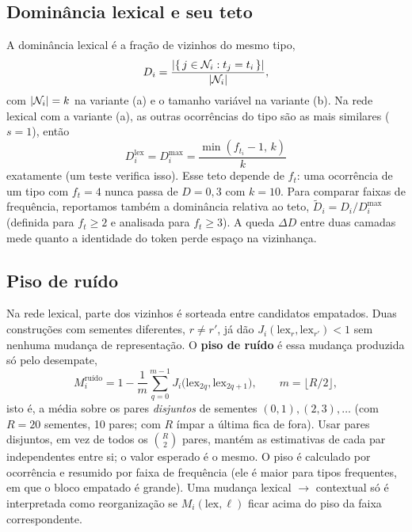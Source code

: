 \subsection{Dominância lexical e seu teto}\label{sec:met-dominancia}

A dominância lexical é a fração de vizinhos do mesmo tipo,
\begin{equation}
    D_i=\frac{|\{\,j\in\mathcal{N}_i : t_j=t_i\,\}|}{|\mathcal{N}_i|},
\end{equation}
com $|\mathcal{N}_i|=k$ na variante (a) e o tamanho variável na variante (b). Na rede lexical com a
variante (a), as outras ocorrências do tipo são as mais similares ($s=1$), então
\begin{equation}
    D_i^{\mathrm{lex}}=D^{\max}_i=\frac{\min(f_{t_i}-1,\,k)}{k}
\end{equation}
exatamente (um teste verifica isso). Esse teto depende de $f_t$: uma ocorrência de um tipo com
$f_t=4$ nunca passa de $D=0{,}3$ com $k=10$. Para comparar faixas de frequência, reportamos
também a dominância relativa ao teto, $\tilde D_i=D_i/D^{\max}_i$ (definida para $f_t\ge2$ e
analisada para $f_t\ge3$). A queda $\Delta D$ entre duas camadas mede quanto a identidade do
token perde espaço na vizinhança.

\subsection{Piso de ruído}\label{sec:met-ruido}

Na rede lexical, parte dos vizinhos é sorteada entre candidatos empatados. Duas construções com
sementes diferentes, $r\neq r'$, já dão $J_i(\mathrm{lex}_r,\mathrm{lex}_{r'})<1$ sem nenhuma
mudança de representação. O \textbf{piso de ruído} é essa mudança produzida só pelo desempate,
\begin{equation}
    M^{\text{ruído}}_i = 1-\frac{1}{m}\sum_{q=0}^{m-1}
        J_i\bigl(\mathrm{lex}_{2q},\mathrm{lex}_{2q+1}\bigr),\qquad m=\lfloor R/2\rfloor,
\end{equation}
isto é, a média sobre os pares \emph{disjuntos} de sementes $(0,1),(2,3),\dots$ (com $R=20$
sementes, 10 pares; com $R$ ímpar a última fica de fora). Usar pares disjuntos, em vez de
todos os $\binom{R}{2}$ pares, mantém as estimativas de cada par independentes entre si; o
valor esperado é o mesmo. O piso é
calculado por ocorrência e resumido por faixa de frequência (ele é maior para tipos frequentes,
em que o bloco empatado é grande). Uma mudança lexical $\to$ contextual só é interpretada como
reorganização se $M_i(\mathrm{lex},\ell)$ ficar acima do piso da faixa correspondente.

